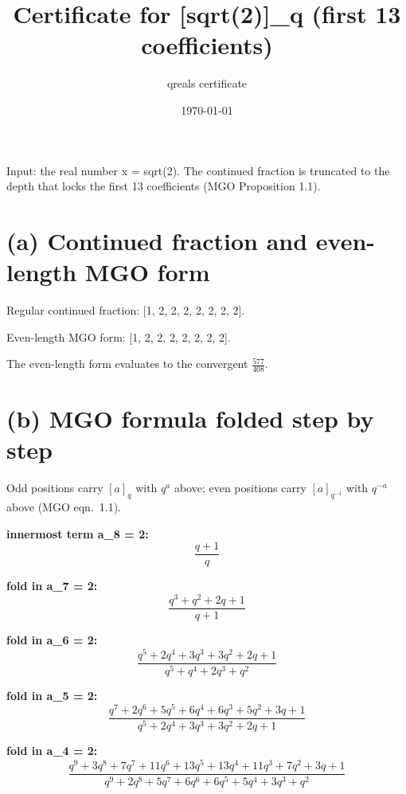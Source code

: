 \documentclass[11pt]{article}
\title{Certificate for [sqrt(2)]\_q (first 13 coefficients)}
\author{qreals certificate}
\date{\today}
\begin{document}
\maketitle

\noindent Input: the real number x = sqrt(2). The continued fraction is truncated to the depth that locks the first 13 coefficients (MGO Proposition 1.1).

\section*{(a) Continued fraction and even-length MGO form}
Regular continued fraction: [1, 2, 2, 2, 2, 2, 2, 2]. \par
Even-length MGO form: [1, 2, 2, 2, 2, 2, 2, 2]. \par
The even-length form evaluates to the convergent $ \frac{577}{408} $.\par

\section*{(b) MGO formula folded step by step}
Odd positions carry $[a]_q$ with $q^a$ above; even positions carry
$[a]_{q^{-1}}$ with $q^{-a}$ above (MGO eqn.~1.1).

\noindent\textbf{innermost term a\_8 = 2:}
{\footnotesize%
\begin{dmath*}
\frac{q + 1}{q}
\end{dmath*}
}

\noindent\textbf{fold in a\_7 = 2:}
{\footnotesize%
\begin{dmath*}
\frac{q^{3} + q^{2} + 2 q + 1}{q + 1}
\end{dmath*}
}

\noindent\textbf{fold in a\_6 = 2:}
{\footnotesize%
\begin{dmath*}
\frac{q^{5} + 2 q^{4} + 3 q^{3} + 3 q^{2} + 2 q + 1}{q^{5} + q^{4} + 2 q^{3} + q^{2}}
\end{dmath*}
}

\noindent\textbf{fold in a\_5 = 2:}
{\footnotesize%
\begin{dmath*}
\frac{q^{7} + 2 q^{6} + 5 q^{5} + 6 q^{4} + 6 q^{3} + 5 q^{2} + 3 q + 1}{q^{5} + 2 q^{4} + 3 q^{3} + 3 q^{2} + 2 q + 1}
\end{dmath*}
}

\noindent\textbf{fold in a\_4 = 2:}
{\footnotesize%
\begin{dmath*}
\frac{q^{9} + 3 q^{8} + 7 q^{7} + 11 q^{6} + 13 q^{5} + 13 q^{4} + 11 q^{3} + 7 q^{2} + 3 q + 1}{q^{9} + 2 q^{8} + 5 q^{7} + 6 q^{6} + 6 q^{5} + 5 q^{4} + 3 q^{3} + q^{2}}
\end{dmath*}
}
\end{document}
